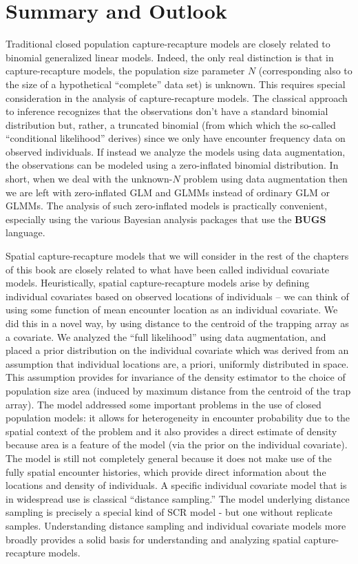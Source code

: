 \section{Summary and Outlook}

Traditional closed population capture-recapture models are closely
related to binomial generalized linear models.  Indeed, the only real
distinction is that in capture-recapture models, the population size
parameter $N$ (corresponding also to the size of a hypothetical
``complete'' data set) is unknown.  This requires special
consideration in the analysis of capture-recapture models. The
classical approach to inference recognizes that the observations don't
have a standard binomial distribution but, rather, a truncated
binomial (from which which the so-called ``conditional likelihood''
derives) since we only have encounter frequency data on observed
individuals. If instead we analyze the models using data augmentation,
the observations can be modeled using a zero-inflated binomial
distribution. In short, when we deal with the unknown-$N$ problem using
data augmentation then we are left with zero-inflated GLM and GLMMs
instead of ordinary GLM or GLMMs. The analysis of such zero-inflated
models is practically convenient, especially using the various
Bayesian analysis packages that use the {\bf BUGS} language.

Spatial capture-recapture models that we will consider in the rest of
the chapters of this book are closely related to what have been called
individual covariate models. Heuristically, spatial capture-recapture
models arise by defining individual covariates based on observed
locations of individuals -- we can think of using some function of
mean encounter location as an individual covariate. We did this in a
novel way, by using distance to the centroid of the trapping array as
a covariate. We analyzed the ``full likelihood'' using data
augmentation, and placed a prior distribution on the individual
covariate which was derived from an assumption that individual
locations are, a priori, uniformly distributed in space. This
assumption provides for invariance of the density estimator to the
choice of population size area (induced by maximum distance from the
centroid of the trap array). The model addressed some important problems in the
use of closed population models: it allows for heterogeneity in
encounter probability due to the spatial context of the problem and it
also provides a direct estimate of density because area is a feature
of the model (via the prior on the individual covariate). The model is
still not completely general because it does not make use of
the fully spatial encounter histories, which provide direct
information about the locations and density of individuals.  A
specific individual covariate model that is in widespread use is
classical ``distance sampling.'' The model underlying distance
sampling is precisely a special kind of SCR model - but one without
replicate samples. Understanding distance sampling and individual
covariate models more broadly provides a solid basis for understanding
and analyzing spatial capture-recapture models.

